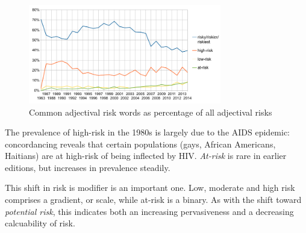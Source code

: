 			\begin{figure}[htb!]
			\centering
			\includegraphics[width=0.75\textwidth]{../images/adjtraj.png}
			\caption{Common adjectival risk words as percentage of all adjectival risks}
			\label{fig:adjtraj}
			\end{figure}

			The prevalence of high-risk in the 1980s is largely due to the AIDS epidemic: concordancing reveals that certain populations (gays, African Americans, Haitians) are at high-risk of being inflected by HIV. \emph{At-risk} is rare in earlier editions, but increases in prevalence steadily.

			This shift in risk is modifier is an important one. Low, moderate and high risk comprises a gradient, or scale, while at-risk is a binary. As with the shift toward \emph{potential risk}, this indicates both an increasing pervasiveness and a decreasing calcuability of risk. %
			





